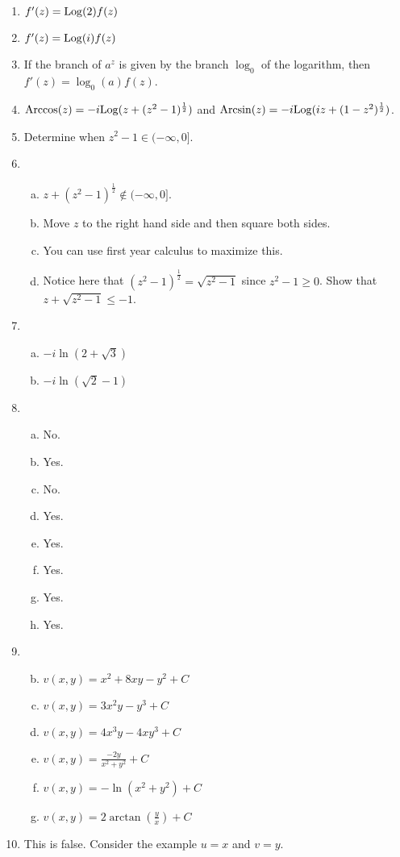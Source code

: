 \begin{enumerate}
\item $f'(z) = \mathrm{Log}(2)f(z)$
\item $f'(z) = \mathrm{Log}(i)f(z)$
\item If the branch of $a^z$ is given by the branch $\log_0$ of the logarithm, then $f'(z) = \log_0(a)f(z)$.
\item $\mathrm{Arccos}(z) = -i\mathrm{Log}(z+(z^2-1)^\frac{1}{2})$ and $\mathrm{Arcsin}(z) = -i\mathrm{Log}(iz + (1-z^2)^\frac{1}{2})$.
\item Determine when $z^2 - 1\in (-\infty,0]$.
\item 
\begin{enumerate}[a)]
	\item $z + (z^2-1)^\frac{1}{2} \not\in (-\infty,0]$.
	\item Move $z$ to the right hand side and then square both sides.
	\item You can use first year calculus to maximize this.
	\item Notice here that $(z^2-1)^\frac{1}{2} = \sqrt{z^2-1}$ since $z^2 - 1 \ge 0$. Show that $z + \sqrt{z^2-1} \le -1$.
\end{enumerate}

\item
\begin{enumerate}[a)]
	\item $-i\ln(2+\sqrt{3})$
	\item $-i\ln(\sqrt{2}-1)$
\end{enumerate}

\item 
\begin{enumerate}[a)]
	\item No.
	\item Yes.
	\item No.
	\item Yes.
	\item Yes.
	\item Yes.
	\item Yes.
	\item Yes.
\end{enumerate}

\item \begin{enumerate}[a)]
\setcounter{enumii}{1}
	\item $v(x,y) = x^2 + 8xy - y^2 + C$
\setcounter{enumii}{3}
	\item $v(x,y) = 3x^2y - y^3 + C$
	\item $v(x,y) = 4x^3y - 4xy^3+ C$
	\item $v(x,y) = \frac{-2y}{x^2+y^2} + C$
	\item $v(x,y) = -\ln(x^2+y^2) + C$
	\item $v(x,y) = 2\arctan\left(\frac{y}{x}\right) + C$
\end{enumerate}

\item This is false. Consider the example $u = x$ and $v = y$.

\end{enumerate}

